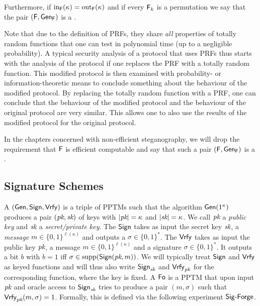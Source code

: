 Furthermore, if
$\operatorname{in}_{\operatorname{\mathsf{F}}}(\kappa)=\operatorname{out}_{\operatorname{\mathsf{F}}}(\kappa)$ and if every $\operatorname{\mathsf{F}}_{k}$ is a permutation we
say that the pair $(\operatorname{\mathsf{F}},\operatorname{\mathsf{Gen}}_{\operatorname{\mathsf{F}}})$ is a .

Note that due to the definition of \acp{PRF}, they share \emph{all}
properties of totally random functions that one can test in polynomial
time (up to a negligible probability). A typical security analysis of a
protocol that uses \acp{PRF} thus starts with the analysis of the
protocol if one replaces the \ac{PRF} with a totally random
function. This modified protocol is then examined with
probability- or information-theoretic means to conclude something about
the behaviour of the modified protocol. By replacing the totally
random function with a \ac{PRF}, one can conclude that the behaviour of
the modified protocol and the behaviour of the original protocol are
very similar. This allows one to also use the results of the modified
protocol for the original protocol. 


In the chapters concerned with
non-efficient steganography, we will drop the requirement that $\operatorname{\mathsf{F}}$ is
efficient computable and say that such a pair $(\operatorname{\mathsf{F}},\operatorname{\mathsf{Gen}}_{\operatorname{\mathsf{F}}})$ is a
. 


\subsection*{Signature Schemes}
A  $(\operatorname{\mathsf{Gen}},\operatorname{\mathsf{Sign}},\operatorname{\mathsf{Vrfy}})$ is a triple of
\acp{PPTM} such that the algorithm $\operatorname{\mathsf{Gen}}(1^{\kappa})$ produces a pair $(\textit{pk},\textit{sk})$ of
keys with $|\textit{pk}| = \kappa$ and $|\textit{sk}| = \kappa$. We call $\textit{pk}$ a
\emph{public key} and $\textit{sk}$ a \emph{secret/private key}. The  $\operatorname{\mathsf{Sign}}$ takes as input the secret key $\textit{sk}$, a \emph{message}
$m\in \{0,1\}^{\ell(\kappa)}$ and outputs a  $\sigma\in
\{0,1\}^{*}$. The  $\operatorname{\mathsf{Vrfy}}$ takes as input the
public key $\textit{pk}$, a message $m\in \{0,1\}^{\ell(\kappa)}$ and a signature
$\sigma\in \{0,1\}^{*}$. It outputs a bit $b$ with $b=1$ iff $\sigma \in
\operatorname{supp}(\operatorname{\mathsf{Sign}}(\textit{pk},m))$. We will typically treat $\operatorname{\mathsf{Sign}}$ and $\operatorname{\mathsf{Vrfy}}$ as
keyed functions and will thus also write $\operatorname{\mathsf{Sign}}_{\textit{sk}}$ and $\operatorname{\mathsf{Vrfy}}_{\textit{pk}}$
for the corresponding function, where the key is fixed. A 
$\operatorname{\mathsf{Fo}}$ is a \ac{PPTM} that upon input $\textit{pk}$ and oracle access to
$\operatorname{\mathsf{Sign}}_{\textit{sk}}$ tries to produce a pair $(m,\sigma)$ such that
$\operatorname{\mathsf{Vrfy}}_{\textit{pk}}(m,\sigma)=1$. Formally, this is defined via the following
experiment $\Sig-Forge$.

